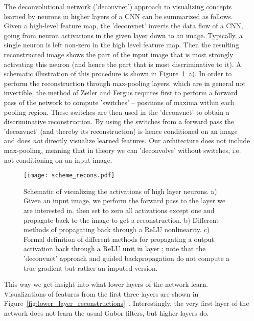 \documentclass{article} \usepackage{iclr2015,times}
\begin{document}
The deconvolutional network ('deconvnet') approach to visualizing concepts learned by neurons in higher layers of a CNN can be summarized as follows. Given a high-level feature map, the 'deconvnet' inverts the data flow of a CNN, going from neuron activations in the given layer down to an image. Typically, a single neuron is left non-zero in the high level feature map. Then the resulting reconstructed image shows the part of the input image that is most strongly activating this neuron (and hence the part that is most discriminative to it). A schematic illustration of this procedure is shown in Figure~\ref{fig:scheme_deconv}~a).
In order to perform the reconstruction through max-pooling layers, which are in general not invertible, the method of Zeiler and Fergus requires first to perform a forward pass of the network to compute 'switches' -- positions of maxima within each pooling region. These switches are then used in the 'deconvnet' to obtain a discriminative reconstruction. By using the switches from a forward pass the 'deconvnet' (and thereby its reconstruction) is hence conditioned on an image and does \emph{not} directly visualize learned features. Our architecture does not include max-pooling, meaning that in theory we can 'deconvolve' without switches, i.e. not conditioning on an input image. 
\begin{figure}[h!]
\begin{center}
\texttt{[image: scheme\_recons.pdf]}
\end{center}
\caption{Schematic of visualizing the activations of high layer
  neurons. a) Given an input image, we perform the forward pass to the
  layer we are interested in, then set to zero all activations except
  one and propagate back to the image to get a reconstruction. b)
  Different methods of propagating back through a ReLU
  nonlinearity. c) Formal definition of different methods for
  propagating a output activation  back through a ReLU unit in
  layer ; note that the 'deconvnet' approach and guided backpropagation 
  do not compute a true gradient but rather an imputed version.}
\label{fig:scheme_deconv}
\end{figure}This way we get insight into what lower layers of the network learn. Visualizations of features from the first three layers are shown in Figure~\ref{fig:lower_layer_reconstructions}~. Interestingly, the very first layer of the network does not learn the usual Gabor filters, but higher layers do. 
\end{document}
